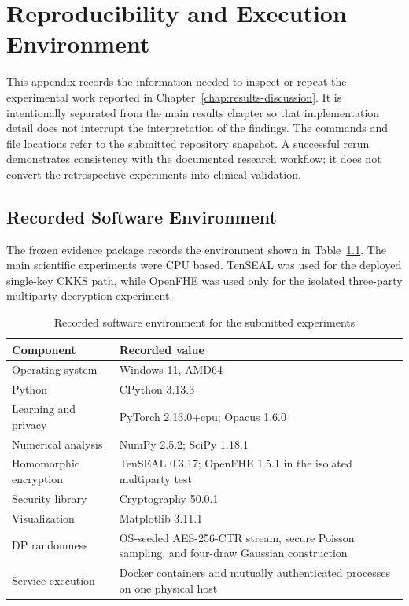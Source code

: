 \appendix

\chapter{Reproducibility and Execution Environment}
\label{app:reproducibility}

This appendix records the information needed to inspect or repeat the experimental work reported in Chapter~\ref{chap:results-discussion}. It is intentionally separated from the main results chapter so that implementation detail does not interrupt the interpretation of the findings. The commands and file locations refer to the submitted repository snapshot. A successful rerun demonstrates consistency with the documented research workflow; it does not convert the retrospective experiments into clinical validation.

\section{Recorded Software Environment}
\label{appsec:software-environment}

The frozen evidence package records the environment shown in Table~\ref{tab:appendix-environment}. The main scientific experiments were CPU based. TenSEAL was used for the deployed single-key CKKS path, while OpenFHE was used only for the isolated three-party multiparty-decryption experiment.

\begin{table}[htbp]
    \centering
    \caption{Recorded software environment for the submitted experiments}
    \label{tab:appendix-environment}
    \begin{tabularx}{\textwidth}{@{}lX@{}}
        \toprule
        Component & Recorded value \\
        \midrule
        Operating system & Windows 11, AMD64 \\
        Python & CPython 3.13.3 \\
        Learning and privacy & PyTorch 2.13.0+cpu; Opacus 1.6.0 \\
        Numerical analysis & NumPy 2.5.2; SciPy 1.18.1 \\
        Homomorphic encryption & TenSEAL 0.3.17; OpenFHE 1.5.1 in the isolated multiparty test \\
        Security library & Cryptography 50.0.1 \\
        Visualization & Matplotlib 3.11.1 \\
        DP randomness & OS-seeded AES-256-CTR stream, secure Poisson sampling, and four-draw Gaussian construction \\
        Service execution & Docker containers and mutually authenticated processes on one physical host \\
        \bottomrule
    \end{tabularx}
\end{table}

